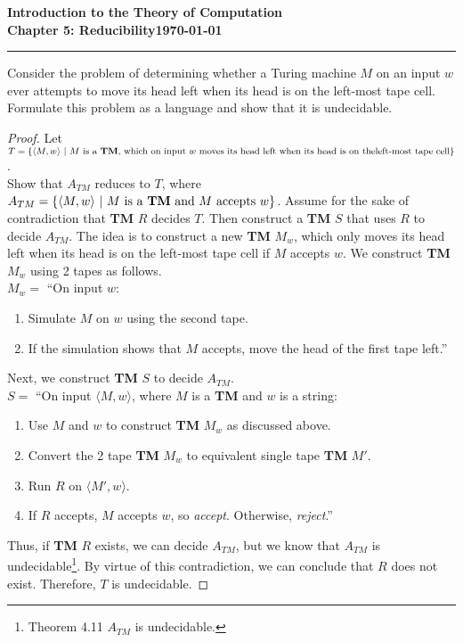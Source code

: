 \documentclass[11pt]{article}
\newcommand{\dated}{\today}
\begin{document}
\textbf{Introduction to the Theory of
Computation}\hfill\textbf{\myname}\\[0.01in]
\textbf{Chapter 5: Reducibility}\hfill\textbf{\dated}\\
\smallskip\hrule\bigskip

\begin{problem}{5.14}
Consider the problem of determining whether a Turing machine $M$ on an input
$w$ ever attempts to move its head left when its head is on the left-most tape cell. Formulate this problem as a language and show that it is undecidable.
\end{problem}

\begin{proof}
Let $T = \{\langle M, w \rangle \ | \ M \text{ is a \textbf{TM}, which on input } w \text{ moves its head left when its head is on the} \\ \text{left-most tape cell}\}$. \\

Show that $A_{TM}$ reduces to $T$, where $A_{TM} = \{\langle M, w \rangle \ | \ M \text{ is a \textbf{TM} and } M \text{ accepts } w\}$. Assume for the sake of contradiction that \textbf{TM} $R$ decides $T$. Then construct a \textbf{TM} $S$ that uses $R$ to decide $A_{TM}$. The idea is to construct a new \textbf{TM} $M_w$, which only moves its head left when its head is on the left-most tape cell if $M$ accepts $w$. We construct \textbf{TM} $M_w$ using 2 tapes as follows. \\

$M_w =$ \textquotedblleft On input $w$:
\begin{enumerate}
\item Simulate $M$ on $w$ using the second tape.
\item If the simulation shows that $M$ accepts, move the head of the first tape left.\textquotedblright
\end{enumerate}

Next, we construct \textbf{TM} $S$ to decide $A_{TM}$. \\

$S =$ \textquotedblleft On input $\langle M, w \rangle$, where $M$ is a \textbf{TM} and $w$ is a string:
\begin{enumerate}
\item Use $M$ and $w$ to construct \textbf{TM} $M_w$ as discussed above.
\item Convert the 2 tape \textbf{TM} $M_w$ to equivalent single tape \textbf{TM} $M'$.
\item Run $R$ on $\langle M', w \rangle$.
\item If $R$ accepts, $M$ accepts $w$, so \textit{accept}. Otherwise, \textit{reject}.\textquotedblright
\end{enumerate}
Thus, if \textbf{TM} $R$ exists, we can decide $A_{TM}$, but we know that $A_{TM}$ is undecidable\footnote{Theorem 4.11 $A_{TM}$ is undecidable.}. By virtue of this contradiction, we can conclude that $R$ does not exist. Therefore, $T$ is undecidable.
\end{proof}
\end{document}

